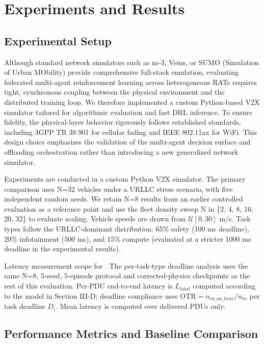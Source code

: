 \documentclass[journal,10pt,twocolumn]{IEEEtran}
\begin{document}
\section{Experiments and Results}\label{sec:results}

\subsection{Experimental Setup}
Although standard network simulators such as ns-3, Veins, or SUMO (Simulation of Urban MObility) provide comprehensive full-stack emulation, evaluating federated multi-agent reinforcement learning across heterogeneous RATs requires tight, synchronous coupling between the physical environment and the distributed training loop. We therefore implemented a custom Python-based V2X simulator tailored for algorithmic evaluation and fast DRL inference. To ensure fidelity, the physical-layer behavior rigorously follows established standards, including 3GPP TR 38.901 for cellular fading and IEEE 802.11ax for WiFi. This design choice emphasizes the validation of the multi-agent decision surface and offloading orchestration rather than introducing a new generalized network simulator.



Experiments are conducted in a custom Python V2X simulator. The primary comparison uses N=32 vehicles under a URLLC stress scenario, with five independent random seeds. We retain N=8 results from an earlier controlled evaluation as a reference point and use the fleet density sweep N in \{2, 4, 8, 16, 20, 32\} to evaluate scaling. Vehicle speeds are drawn from $\mathcal{U}[0, 30]$ m/s. Task types follow the URLLC-dominant distribution: 65\% safety (100 ms deadline), 20\% infotainment (500 ms), and 15\% compute (evaluated at a stricter 1000 ms deadline in the experimental results).

Latency measurement scope for . The per-task-type deadline analysis uses the same N=8, 5-seed, 5-episode protocol and corrected-physics checkpoints as the rest of this evaluation. Per-PDU end-to-end latency is $L_{total}$ computed according to the model in Section III-D; deadline compliance uses $\text{OTR} = n_{rx\_on\_time}/n_{tx}$ per task deadline $D_i$. Mean latency is computed over delivered PDUs only.


\subsection{Performance Metrics and Baseline Comparison}
\end{document}
